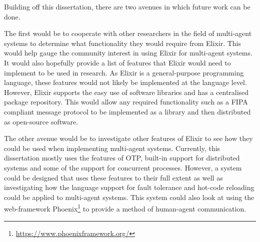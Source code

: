 Building off this dissertation, there are two avenues in which future work can be done.

The first would be to cooperate with other researchers in the field of multi-agent systems to determine what functionality they would require from Elixir.
This would help gauge the community interest in using Elixir for multi-agent systems.
It would also hopefully provide a list of features that Elixir would need to implement to be used in research.
As Elixir is a general-purpose programming language, these features would not likely be implemented at the language level.
However, Elixir supports the easy use of software libraries and has a centralised package repository.
This would allow any required functionality such as a FIPA compliant message protocol to be implemented as a library and then distributed as open-source software.

The other avenue would be to investigate other features of Elixir to see how they could be used when implementing multi-agent systems.
Currently, this dissertation mostly uses the features of OTP, built-in support for distributed systems and some of the support for concurrent processes.
However, a system could be designed that uses these features to their full extent as well as investigating how the language support for fault tolerance and hot-code reloading could be applied to multi-agent systems.
This system could also look at using the web-framework Phoenix\footnote{\url{https://www.phoenixframework.org/}} to provide a method of human-agent communication.
